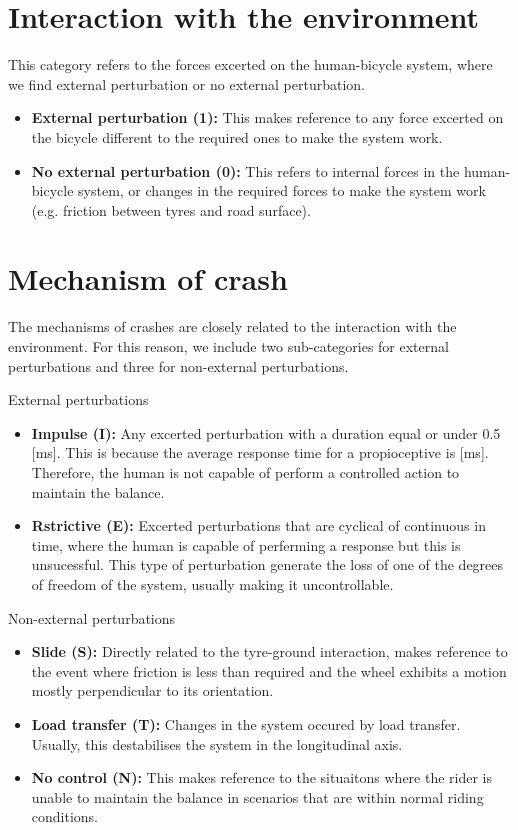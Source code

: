 \documentclass{article}
\begin{document}
\section{Interaction with the environment}

This category refers to the forces excerted on the human-bicycle system, where we find external perturbation or no external perturbation.

\begin{itemize}
    \item \textbf{External perturbation (1):} This makes reference to any force excerted on the bicycle different to the required ones to make the system work. 
    \item \textbf{No external perturbation (0):} This refers to internal forces in the human-bicycle system, or changes in the required forces to make the system work (e.g. friction between tyres and road surface).
\end{itemize}

\section{Mechanism of crash}

The mechanisms of crashes are closely related to the interaction with the environment.
%
For this reason, we include two sub-categories for external perturbations and three for non-external perturbations.

External perturbations
\begin{itemize}
    \item \textbf{Impulse (I):} Any excerted perturbation with a duration equal or under 0.5 [ms].
        This is because the average response time for a propioceptive {} is {} [ms].
        Therefore, the human is not capable of perform a controlled action to maintain the balance.
    \item \textbf{Rstrictive (E):} Excerted perturbations that are cyclical of continuous in time, where the human is capable of perferming a response but this is unsucessful.
        This type of perturbation generate the loss of one of the degrees of freedom of the system, usually making it uncontrollable.
\end{itemize}

Non-external perturbations
\begin{itemize}
    \item \textbf{Slide (S):} Directly related to the tyre-ground interaction, makes reference to the event where friction is less than required and the wheel exhibits a motion mostly perpendicular to its orientation.
    \item \textbf{Load transfer (T):} Changes in the system occured by load transfer.
        Usually, this destabilises the system in the longitudinal axis.
    \item \textbf{No control (N):} This makes reference to the situaitons where the rider is unable to maintain the balance in scenarios that are within normal riding conditions.
\end{itemize}
\end{document}
